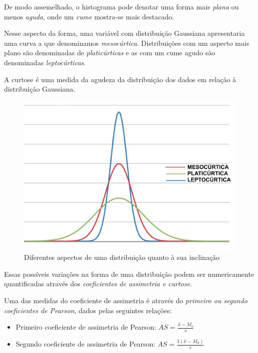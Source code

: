 \documentclass[
]{book}
\providecommand{\tightlist}{%
  \setlength{\itemsep}{0pt}\setlength{\parskip}{0pt}}
\begin{document}
\hfill\break

De modo assemelhado, o histograma pode denotar uma forma mais \emph{plana} ou menos \emph{aguda}, onde um \emph{cume} mostra-se mais destacado.

\hfill\break

Nesse aspecto da forma, uma variável com distribuição Gaussiana apresentaria uma curva a que denominamos \emph{mesocúrtica}. Distribuições com um aspecto mais plano são denominadas de \emph{platicúrticas} e as com um cume agudo são denominadas \emph{leptocúrticas}.

\hfill\break

A curtose é uma medida da agudeza da distribuição dos dados em relação à distribuição Gaussiana.

\hfill\break

\begin{figure}

{\centering \includegraphics[width=0.8\linewidth]{images3/curtose} 

}

\caption{Diferentes aspectos de uma distribuição quanto à sua inclinação}\label{fig:unnamed-chunk-38}
\end{figure}

\hfill\break

Essas possíveis variações na forma de uma distribuição podem ser numericamente quantificadas através dos \emph{coeficientes de assimetria e curtose}.

\hfill\break

Uma das medidas do coeficiente de assimetria é através do \emph{primeiro ou segundo coeficientes de Pearson}, dados pelas seguintes relações:

\hfill\break

\begin{itemize}
\tightlist
\item
  Primeiro coeficiente de assimetria de Pearson: \(AS= \frac{ \stackrel{-}{x} - M_{o} }{ s }\)
\item
  Segundo coeficiente de assimetria de Pearson: \(AS = \frac{ 3 ( \stackrel{-}{x} - M_{d}) } { s }\)
\end{itemize}
\end{document}
